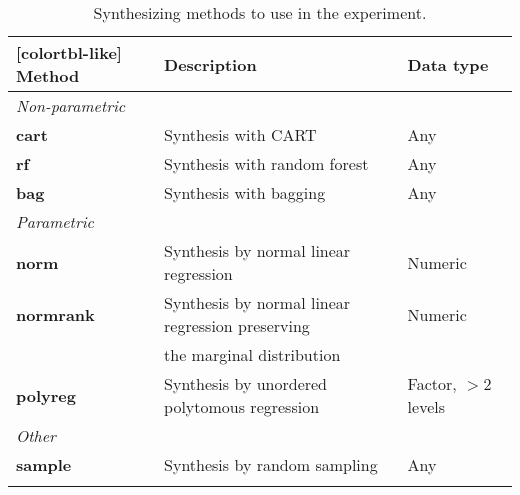 \begin{table}[h]
    \centering
    \caption{Synthesizing methods to use in the experiment.}
    \begin{NiceTabular}{@{}lll@{}}[colortbl-like]\hline 
         Method & Description & Data type \\\hline
         \textit{Non-parametric} & & \\
         \textbf{cart} & Synthesis with CART & Any\\
         \textbf{rf} & Synthesis with random forest & Any\\
         \textbf{bag} & Synthesis with bagging & Any\\
         \textit{Parametric} & & \\
         \textbf{norm} & Synthesis by normal linear regression & Numeric\\
         \textbf{normrank} & Synthesis by normal linear regression preserving & Numeric\\
          & the marginal distribution & \\
         \textbf{polyreg} & Synthesis by unordered polytomous regression & Factor, $>2$ levels\\
         \textit{Other} & & \\
         \textbf{sample} & Synthesis by random sampling & Any\\\hline
         & & \\
        

\end{NiceTabular}
\end{table}
